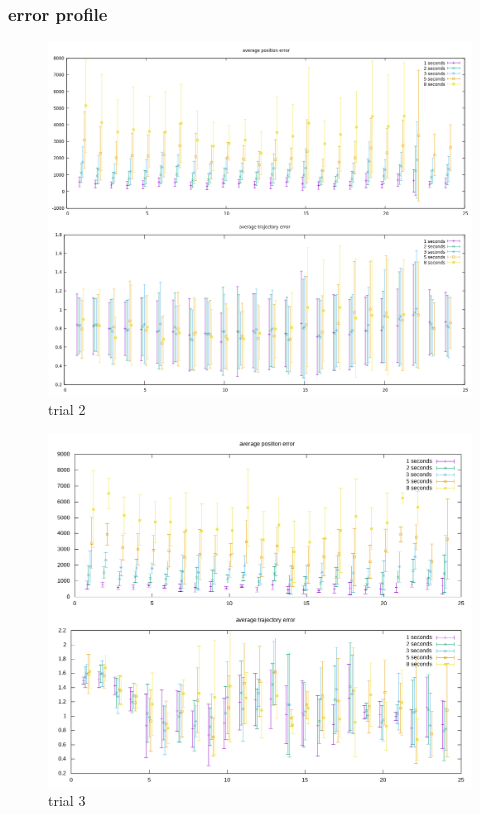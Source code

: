 \documentclass[10pt,a4paper]{article}
\begin{document}
\subsubsection{error profile}
\begin{figure}[H]
\caption{trial 2} 
\includegraphics[width=\textwidth]{../graphs/error_profile2.png}
\end{figure}
\begin{figure}[H]
\caption{trial 3} 
\includegraphics[width=\textwidth]{../graphs/error_profile3.png}
\end{figure}
\end{document}
